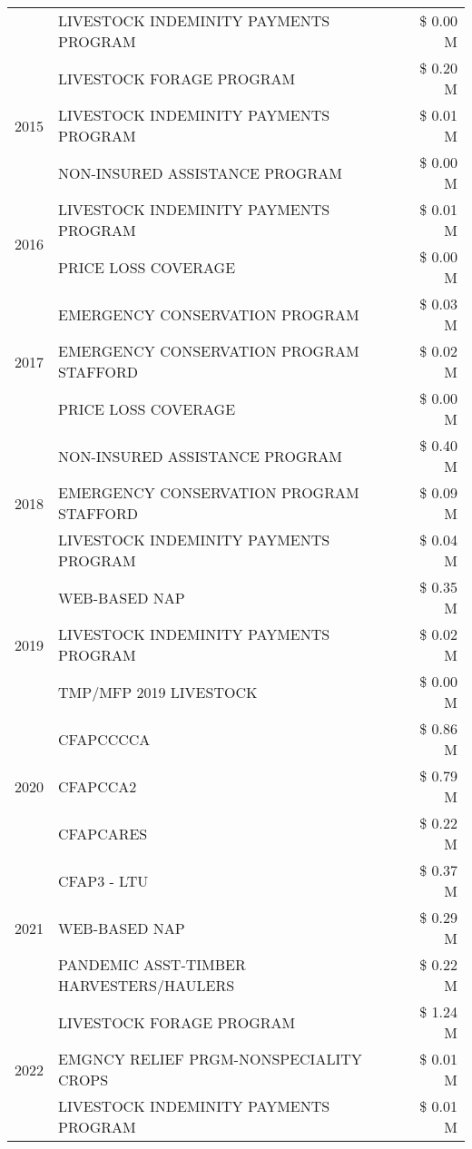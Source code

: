 \begin{tabular}{llr}
 & LIVESTOCK INDEMINITY PAYMENTS PROGRAM & \$ 0.00 M \\
\cline{1-3}
\multirow[t]{3}{*}{2015} & LIVESTOCK FORAGE PROGRAM & \$ 0.20 M \\
 & LIVESTOCK INDEMINITY PAYMENTS PROGRAM & \$ 0.01 M \\
 & NON-INSURED ASSISTANCE PROGRAM & \$ 0.00 M \\
\cline{1-3}
\multirow[t]{2}{*}{2016} & LIVESTOCK INDEMINITY PAYMENTS PROGRAM & \$ 0.01 M \\
 & PRICE LOSS COVERAGE & \$ 0.00 M \\
\cline{1-3}
\multirow[t]{3}{*}{2017} & EMERGENCY CONSERVATION PROGRAM & \$ 0.03 M \\
 & EMERGENCY CONSERVATION PROGRAM STAFFORD & \$ 0.02 M \\
 & PRICE LOSS COVERAGE & \$ 0.00 M \\
\cline{1-3}
\multirow[t]{3}{*}{2018} & NON-INSURED ASSISTANCE PROGRAM & \$ 0.40 M \\
 & EMERGENCY CONSERVATION PROGRAM STAFFORD & \$ 0.09 M \\
 & LIVESTOCK INDEMINITY PAYMENTS PROGRAM & \$ 0.04 M \\
\cline{1-3}
\multirow[t]{3}{*}{2019} & WEB-BASED NAP & \$ 0.35 M \\
 & LIVESTOCK INDEMINITY PAYMENTS PROGRAM & \$ 0.02 M \\
 & TMP/MFP 2019 LIVESTOCK & \$ 0.00 M \\
\cline{1-3}
\multirow[t]{3}{*}{2020} & CFAPCCCCA & \$ 0.86 M \\
 & CFAPCCA2 & \$ 0.79 M \\
 & CFAPCARES & \$ 0.22 M \\
\cline{1-3}
\multirow[t]{3}{*}{2021} & CFAP3 - LTU & \$ 0.37 M \\
 & WEB-BASED NAP & \$ 0.29 M \\
 & PANDEMIC ASST-TIMBER HARVESTERS/HAULERS & \$ 0.22 M \\
\cline{1-3}
\multirow[t]{3}{*}{2022} & LIVESTOCK FORAGE PROGRAM & \$ 1.24 M \\
 & EMGNCY RELIEF PRGM-NONSPECIALITY CROPS & \$ 0.01 M \\
 & LIVESTOCK INDEMINITY PAYMENTS PROGRAM & \$ 0.01 M \\
\cline{1-3}
\bottomrule
\end{tabular}
